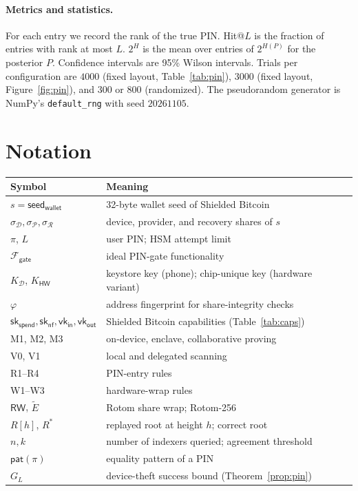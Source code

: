 \documentclass[11pt]{article}
\theoremstyle{remark}
\newcommand{\sk}{\mathsf{sk}}
\newcommand{\vk}{\mathsf{vk}}
\newcommand{\seed}{\mathsf{seed}_{\mathsf{wallet}}}
\newcommand{\SB}{Shielded Bitcoin}
\begin{document}
\paragraph{Metrics and statistics.} For each entry we record the rank of the true PIN. Hit@$L$ is the fraction of entries with rank at most $L$. $2^{H}$ is the mean over entries of $2^{H(P)}$ for the posterior $P$. Confidence intervals are 95\% Wilson intervals. Trials per configuration are $4000$ (fixed layout, Table~\ref{tab:pin}), $3000$ (fixed layout, Figure~\ref{fig:pin}), and $300$ or $800$ (randomized). The pseudorandom generator is NumPy's \texttt{default\_rng} with seed $20261105$.

\section{Notation}
\label{app:notation}
\begin{center}\small
\begin{tabularx}{\linewidth}{@{}lX@{}}
\toprule
Symbol & Meaning \\
\midrule
$s = \seed$ & 32-byte wallet seed of \SB{} \\
$\sigma_{\mathcal{D}}, \sigma_{\mathcal{P}}, \sigma_{\mathcal{R}}$ & device, provider, and recovery shares of $s$ \\
$\pi$, $L$ & user PIN; HSM attempt limit \\
$\mathcal{F}_{\mathsf{gate}}$ & ideal PIN-gate functionality \\
$K_{\mathcal{D}}$, $K_{\mathsf{HW}}$ & keystore key (phone); chip-unique key (hardware variant) \\
$\varphi$ & address fingerprint for share-integrity checks \\
$\sk_{\mathsf{spend}}, \sk_{\mathsf{nf}}, \vk_{\mathsf{in}}, \vk_{\mathsf{out}}$ & \SB{} capabilities (Table~\ref{tab:caps}) \\
M1, M2, M3 & on-device, enclave, collaborative proving \\
V0, V1 & local and delegated scanning \\
R1--R4 & PIN-entry rules \\
W1--W3 & hardware-wrap rules \\
$\mathsf{RW}$, $\widetilde{E}$ & Rotom share wrap; Rotom-256 \\
$R[h]$, $R^\ast$ & replayed root at height $h$; correct root \\
$n, k$ & number of indexers queried; agreement threshold \\
$\mathsf{pat}(\pi)$ & equality pattern of a PIN \\
$G_L$ & device-theft success bound (Theorem~\ref{prop:pin}) \\
\bottomrule
\end{tabularx}
\end{center}
\end{document}
